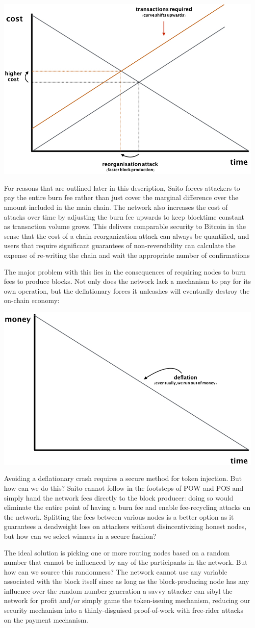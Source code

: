 \documentclass[11.5pt, oneside]{article}   	%
\begin{document}
\begin{multicols}{2}
\includegraphics[width=.45\textwidth]{saito3.jpeg}

For reasons that are outlined later in this description, Saito forces attackers to pay the entire burn fee rather than just cover the marginal difference over the amount included in the main chain. The network also increases the cost of attacks over time by adjusting the burn fee upwards to keep blocktime constant as transaction volume grows. This delivers comparable security to Bitcoin in the sense that the cost of a chain-reorganization attack can always be quantified, and users that require significant guarantees of non-reversibility can calculate the expense of re-writing the chain and wait the appropriate number of confirmations

The major problem with this lies in the consequences of requiring nodes to burn fees to produce blocks. Not only does the network lack a mechanism to pay for its own operation, but the deflationary forces it unleashes will eventually destroy the on-chain economy:

\includegraphics[width=.45\textwidth]{saito4.jpeg}

Avoiding a deflationary crash requires a secure method for token injection. But how can we do this? Saito cannot follow in the footsteps of POW and POS and simply hand the network fees directly to the block producer: doing so would eliminate the entire point of having a burn fee and enable fee-recycling attacks on the network. Splitting the fees between various nodes is a better option as it guarantees a deadweight loss on attackers without disincentivizing honest nodes, but how can we select winners in a secure fashion? 

The ideal solution is picking one or more routing nodes based on a random number that cannot be influenced by any of the participants in the network. But how can we source this randomness? The network cannot use any variable associated with the block itself since as long as the block-producing node has any influence over the random number generation a savvy attacker can sibyl the network for profit and/or simply game the token-issuing mechanism, reducing our security mechanism into a thinly-disguised proof-of-work with free-rider attacks on the payment mechanism.


\end{multicols}
\end{document}
